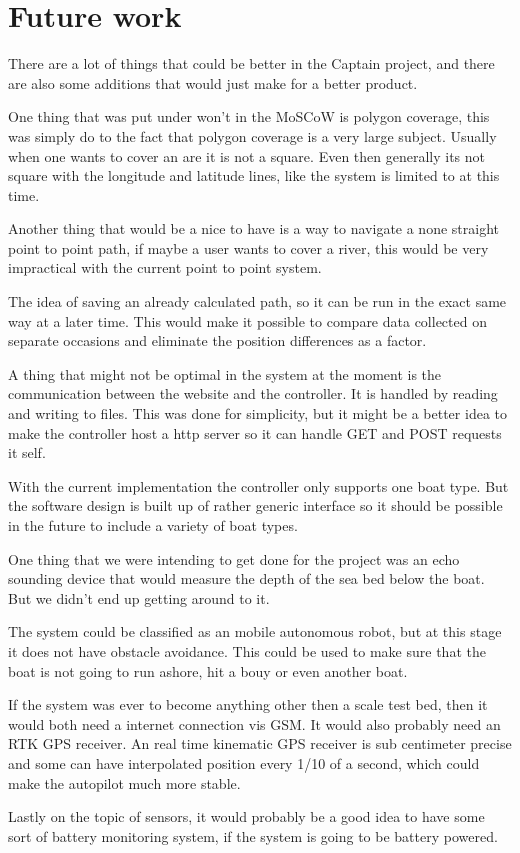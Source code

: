 \newpage
\chapter{Future work}
There are a lot of things that could be better in the Captain project, and there are also some additions that would just make for a better product.

One thing that was put under won't in the MoSCoW is polygon coverage, this was simply do to the fact that polygon coverage is a very large subject. Usually when one wants to cover an are it is not a square. Even then generally its not square with the longitude and latitude lines, like the system is limited to at this time. 

Another thing that would be a nice to have is a way to navigate a none straight point to point path, if maybe a user wants to cover a river, this would be very impractical with the current point to point system. 

The idea of saving an already calculated path, so it can be run in the exact same way at a later time. This would make it possible to compare data collected on separate occasions and eliminate the position differences as a factor.

A thing that might not be optimal in the system at the moment is the communication between the website and the controller. It is handled by reading and writing to files. This was done for simplicity, but it might be a better idea to make the controller host a http server so it can handle GET and POST requests it self.  

With the current implementation the controller only supports one boat type. But the software design is built up of rather generic interface so it should be possible in the future to include a variety of boat types.

One thing that we were intending to get done for the project was an echo sounding device that would measure the depth of the sea bed below the boat. But we didn't end up getting around to it.

The system could be classified as an mobile autonomous robot, but at this stage it does not have obstacle avoidance. This could be used to make sure that the boat is not going to run ashore, hit a bouy or even another boat. 

If the system was ever to become anything other then a scale test bed, then it would both need a internet connection vis GSM. It would also probably need an RTK GPS receiver. An real time kinematic GPS receiver is sub centimeter precise and some can have interpolated position every 1/10 of a second, which could make the autopilot much more stable.

Lastly on the topic of sensors, it would probably be a good idea to have some sort of battery monitoring system, if the system is going to be battery powered. 

